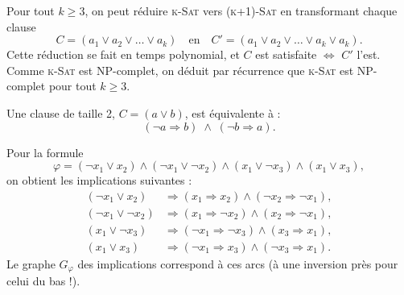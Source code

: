 \begin{corrections}
\begin{questions}
  \item Pour tout $k \ge 3$, on peut réduire \textsc{k-Sat} vers \textsc{(k+1)-Sat} en transformant chaque clause
    \[
      C = (a_1 \lor a_2 \lor \dots \lor a_k)
      \quad\text{en}\quad
      C' = (a_1 \lor a_2 \lor \dots \lor a_k \lor a_k).
    \]
    Cette réduction se fait en temps polynomial, et $C$ est satisfaite $\Leftrightarrow$ $C'$ l’est.  
    Comme \textsc{k-Sat} est NP-complet, on déduit par récurrence que \textsc{k-Sat} est NP-complet pour tout $k \ge 3$.

  \item Une clause de taille 2, $C = (a \lor b)$, est équivalente à :
    \[
      (\neg a \Rightarrow b) \;\land\; (\neg b \Rightarrow a).
    \]

  \item Pour la formule
    \[
      \varphi = (\neg x_1 \lor x_2)
      \land (\neg x_1 \lor \neg x_2)
      \land (x_1 \lor \neg x_3)
      \land (x_1 \lor x_3),
    \]
    on obtient les implications suivantes :
    \begin{align*}
      (\neg x_1 \lor x_2) &\Rightarrow (x_1 \Rightarrow x_2) \land (\neg x_2 \Rightarrow \neg x_1),\\
      (\neg x_1 \lor \neg x_2) &\Rightarrow (x_1 \Rightarrow \neg x_2) \land (x_2 \Rightarrow \neg x_1),\\
      (x_1 \lor \neg x_3) &\Rightarrow (\neg x_1 \Rightarrow \neg x_3) \land (x_3 \Rightarrow x_1),\\
      (x_1 \lor x_3) &\Rightarrow (\neg x_1 \Rightarrow x_3) \land (\neg x_3 \Rightarrow x_1).
    \end{align*}
    Le graphe $G_\varphi$ des implications correspond à ces arcs (à une inversion près pour celui du bas !).

    \begin{center}
\end{center}
\end{questions}
\end{corrections}
